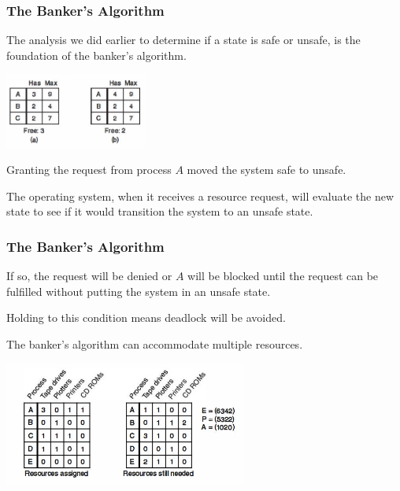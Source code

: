 \begin{frame}
\frametitle{The Banker's Algorithm}


The analysis we did earlier to determine if a state is safe or unsafe, is the foundation of the banker's algorithm. 

\begin{center}
\includegraphics[width=0.35\textwidth]{images/unsafe-state-initial.png}
\end{center}

Granting the request from process $A$ moved the system safe to unsafe.

The operating system, when it receives a resource request, will evaluate the new state to see if it would transition the system to an unsafe state.

\end{frame}

\begin{frame}
\frametitle{The Banker's Algorithm}

If so, the request will be denied or $A$ will be blocked until the request can be fulfilled without putting the system in an unsafe state. 

Holding to this condition means deadlock will be avoided.

The banker's algorithm can accommodate multiple resources.

\begin{center}
\includegraphics[width=0.6\textwidth]{images/bankers-multiple.png}
\end{center}


\end{frame}

